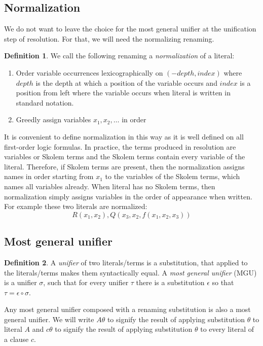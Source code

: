 \documentclass[english, shortabstract]{iithesis}
\theoremstyle{definition} \newtheorem{definition}{Definition}[chapter]
\theoremstyle{remark} \newtheorem{remark}[definition]{Observation}
\theoremstyle{plain} \newtheorem{theorem}[definition]{Theorem}
\theoremstyle{plain} \newtheorem{lemma}[definition]{Lemma}
\begin{document}
\subsection{Normalization}
We do not want to leave the choice for the most general unifier at the unification step of resolution.
For that, we will need the normalizing renaming.

\begin{definition}
We call the following renaming a \emph{normalization} of a literal:
\begin{enumerate}
    \item Order variable occurrences lexicographically on $(-\mathit{depth}, \mathit{index})$ 
    where $\mathit{depth}$ is the depth at which a position of the variable occurs and $\mathit{index}$ is a position from left where the variable occurs when literal is written in standard notation.
    \item Greedly assign variables $x_1, x_2, \dots$ in order
\end{enumerate}
\end{definition}

It is convenient to define normalization in this way as it is well defined on all first-order logic formulas.
In practice, the terms produced in resolution are variables or Skolem terms and the Skolem terms contain every variable of the literal.
Therefore, if Skolem terms are present, then the normalization assigns names in order 
starting from $x_1$ to the variables of the Skolem terms, which names all variables already.
When literal has no Skolem terms, then normalization simply assigns variables in the order of appearance when written.
For example these two literals are normalized: $$R(x_1,x_2), Q(x_3, x_2, f(x_1,x_2, x_3))$$

\subsection{Most general unifier}
\begin{definition}\label{def:mgu}
A \emph{unifier} of two literals/terms is a substitution, that applied to the literals/terms makes them syntactically equal. 
A \emph{most general unifier} (MGU) is a unifier $\sigma$, such that for every unifier $\tau$ there is a substitution $\epsilon$ so that $\tau=\epsilon\circ\sigma$.
\end{definition}
Any most general unifier composed with a renaming substitution is also a most general unifier.
We will write $A\theta$ to signify the result of applying substitution $\theta$ to literal $A$
and $c\theta$ to signify the result of applying substitution $\theta$ to every literal of a clause $c$.
\end{document}
